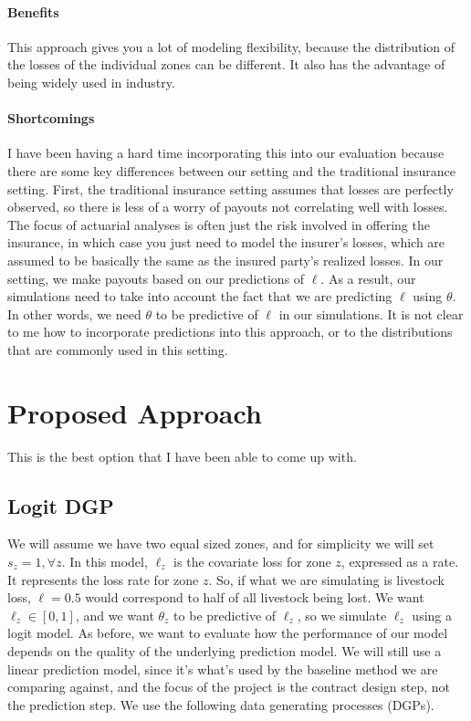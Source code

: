 \documentclass[11pt]{article}
\begin{document}
   \paragraph{Benefits} This approach gives you a lot of modeling flexibility, because the distribution of the losses of the individual zones can be different. It also has the advantage of being widely used in industry. 

   \paragraph{Shortcomings} I have been having a hard time incorporating this into our evaluation because there are some key differences between our setting and the traditional insurance setting. First, the traditional insurance setting assumes that losses are perfectly observed, so there is less of a worry of payouts not correlating well with losses. The focus of actuarial analyses is often just the risk involved in offering the insurance, in which case you just need to model the insurer's losses, which are assumed to be basically the same as the insured party's realized losses. In our setting, we make payouts based on our predictions of $\ell$. As a result, our simulations need to take into account the fact that we are predicting $\ell$ using $\theta$. In other words, we need $\theta$ to be predictive of $\ell$ in our simulations. It is not clear to me how to incorporate predictions into this approach, or to the distributions that are commonly used in this setting. 

\section{Proposed Approach}
  This is the best option that I have been able to come up with.  
  \subsection{Logit DGP}
  We will assume we have two equal sized zones, and for simplicity we will set $s_z = 1, \forall z$. In this model, $\ell_z$ is the covariate loss for zone $z$, expressed as a rate. It represents the loss rate for zone $z$. So, if what we are simulating is livestock loss, $\ell=0.5$ would correspond to half of all livestock being lost. We want $\ell_z \in [0,1]$, and we want $\theta_z$ to be predictive of $\ell_z$, so we simulate $\ell_z$ using a logit model. As before, we want to evaluate how the performance of our model depends on the quality of the underlying prediction model. We will still use a linear prediction model, since it's what's used by the baseline method we are comparing against, and the focus of the project is the contract design step, not the prediction step. We use the following data generating processes (DGPs).
\end{document}
